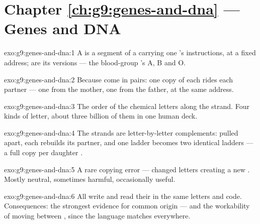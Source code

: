 \section*{Chapter \ref{ch:g9:genes-and-dna} --- Genes and DNA}

\begin{solution}{exo:g9:genes-and-dna:1}
A  is a segment of a  carrying one 's
instructions, at a fixed address;  are its versions
--- the blood-group 's A, B and O.
\end{solution}

\begin{solution}{exo:g9:genes-and-dna:2}
Because  come in pairs: one copy of each 
rides each partner --- one from the mother, one from the
father, at the same address.
\end{solution}

\begin{solution}{exo:g9:genes-and-dna:3}
The order of the chemical letters along the strand. Four
kinds of letter, about three billion of them in one human
deck.
\end{solution}

\begin{solution}{exo:g9:genes-and-dna:4}
The strands are letter-by-letter complements: pulled
apart, each rebuilds its partner, and one ladder becomes
two identical ladders --- a full copy per daughter .
\end{solution}

\begin{solution}{exo:g9:genes-and-dna:5}
A rare copying error --- changed letters creating a new
. Mostly neutral, sometimes harmful, occasionally
useful.
\end{solution}

\begin{solution}{exo:g9:genes-and-dna:6}
All  write and read their  in the same
 letters and code. Consequences: the strongest evidence
for common origin --- and the workability of moving 
between , since the language matches everywhere.
\end{solution}

